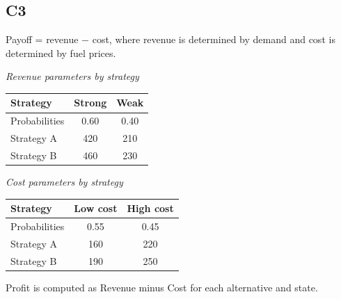\begin{ExamProblems}
		\subsection*{C3}
		Payoff = revenue $-$ cost, where revenue is determined by demand and cost is determined by fuel prices.
		\begin{center}
			\begin{minipage}[t]{0.48\linewidth}
				\textit{Revenue parameters by strategy}
				\begin{center}
					\begin{tabular}{l c c}
						\toprule
						Strategy & Strong & Weak \\
						\midrule
						Probabilities & 0.60 & 0.40 \\
						Strategy A & 420 & 210 \\
						Strategy B & 460 & 230 \\
						\bottomrule
					\end{tabular}
				\end{center}
			\end{minipage}
			\hfill
			\begin{minipage}[t]{0.48\linewidth}
				\textit{Cost parameters by strategy}
				\begin{center}
					\begin{tabular}{l c c}
						\toprule
						Strategy & Low cost & High cost \\
						\midrule
						Probabilities& 0.55 & 0.45 \\
						Strategy A & 160 & 220 \\
						Strategy B & 190 & 250 \\
						\bottomrule
					\end{tabular}
				\end{center}
			\end{minipage}
		\end{center}
		Profit is computed as Revenue minus Cost for each alternative and state.


\end{ExamProblems}
